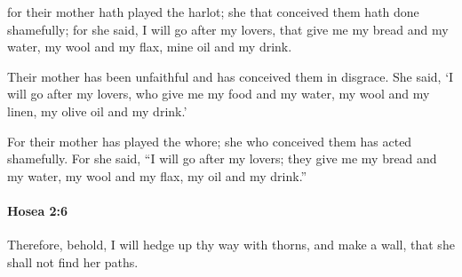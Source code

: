 			\begin{versebox}
					\item[BHS] 
					\item[LXX] 
					\item[ASV] for their mother hath played the harlot; she that conceived them hath done shamefully; for she said, I will go after my lovers, that give me my bread and my water, my wool and my flax, mine oil and my drink.
					\item[NIV] Their mother has been unfaithful and has conceived them in disgrace. She said, ‘I will go after my lovers, who give me my food and my water, my wool and my linen, my olive oil and my drink.’
					\item[NRSV] For their mother has played the whore; she who conceived them has acted shamefully. For she said, “I will go after my lovers; they give me my bread and my water, my wool and my flax, my oil and my drink.”
			\end{versebox}

		\paragraph{Hosea 2:6} %
			\label{HOSEA-2-6}

			Therefore, behold, I will hedge up thy way with thorns, and make a wall, that she shall not find her paths.

